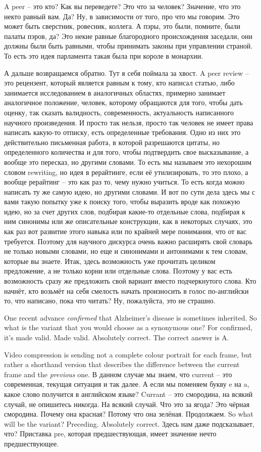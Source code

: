 \documentclass[main.tex]{subfiles}
\begin{document}
A peer -- это кто?
Как вы переведете?
Это что за человек?
Значение, что это некто равный вам.
Да?
Ну, в зависимости от того, про что мы говорим.
Это может быть сверстник, ровесник, коллега.
А пэры, это были, помните, были палаты пэров, да?
Это некие равные благородного происхождения заседали, они должны были быть равными, чтобы принимать законы при управлении страной.
То есть это идея парламента такая была при короле в монархии.

А дальше возвращаемся обратно.
Тут я себя поймала за хвост.
A peer review -- это рецензент, который является равным к тому, кто написал статью, либо занимается исследованием в аналогичных областях, примерно занимает аналогичное положение, человек, которому обращаются для того, чтобы дать оценку, так сказать валидность, современность, актуальность написанного научного произведения.
И просто так нельзя, просто так человек не имеет права написать какую-то отписку, есть определенные требования.
Одно из них это действительно письменная работа, в которой разрешаются цитаты, но определенного количества и для того, чтобы подтвердить свое высказывание, а вообще это пересказ, но другими словами.
То есть мы называем это нехорошим словом rewriting, но идея в рерайтинге, если её утилизировать, то это плохо, а вообще рерайтинг -- это как раз то, чему нужно учиться.
То есть когда можно написать ту же самую идею, но другими словами.
И вот по сути дела здесь мы с вами такую попытку уже к поиску того, чтобы выразить вроде как похожую идею, но за счет других слов, подбирая какие-то отдельные слова, подбирая к ним синонимы или же описательные конструкции, как в некоторых случаях, это как раз вот развитие этого навыка или по крайней мере понимания, что от вас требуется.
Поэтому для научного дискурса очень важно расширять свой словарь не только новыми словами, но еще и синонимами и антонимами к тем словам, которые вы знаете.
Итак, здесь возможность уже прочитать целиком предложение, а не только корни или отдельные слова.
Поэтому у вас есть возможность сразу же предложить свой вариант вместо подчеркнутого слова.
Кто начнёт, кто возьмёт на себя смелость начать произносить в голос по-английски то, что написано, пока что читать?
Ну, пожалуйста, это не страшно.

One recent advance \textit{confirmed} that Alzheimer's disease is sometimes inherited.
So what is the variant that you would choose as a synonymous one?
For confirmed, it's made valid.
Made valid.
Absolutely correct.
The correct answer is A.

Video compression is sending not a complete colour portrait for each frame, but rather a shorthand version that describes the difference between the current frame and the \textit{previous} one.
В данном случае мы знаем, что current -- это современная, текущая ситуация и так далее.
А если мы поменяем букву e на a, какое слово получится в английском языке? 
Currant -- это смородина, на всякий случай, не опишитесь никогда.
На всякий случай.
Что это за ягода? Это чёрная смородина.
Почему она красная? Потому что она зелёная.
Продолжаем.
So what will be the variant?
Preceding.
Absolutely correct.
Здесь нам даже подсказывает, что?
Приставка pre, которая предшествующая, имеет значение нечто предшествующее.
\end{document}
